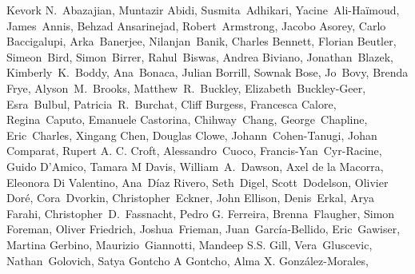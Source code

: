 \begin{raggedright}
\small
Kevork N.\ Abazajian,
Muntazir Abidi,
Susmita~Adhikari,
Yacine~Ali-Ha\"imoud,
James~Annis,
Behzad Ansarinejad,
Robert~Armstrong,
Jacobo Asorey,
Carlo Baccigalupi,
Arka~Banerjee,
Nilanjan~Banik,
Charles Bennett,
Florian Beutler,
Simeon~Bird,
Simon~Birrer,
Rahul~Biswas,
Andrea Biviano,
Jonathan~Blazek,
Kimberly~K.~Boddy,
Ana~Bonaca,
Julian Borrill,
Sownak Bose,
Jo~Bovy,
Brenda Frye,
Alyson~M.~Brooks,
Matthew~R.~Buckley,
Elizabeth~Buckley-Geer,
Esra~Bulbul,
Patricia~R.~Burchat,
Cliff Burgess,
Francesca Calore,
Regina~Caputo,
Emanuele Castorina,
Chihway~Chang,
George~Chapline,
Eric~Charles,
Xingang Chen,
Douglas Clowe,
Johann~Cohen-Tanugi,
Johan Comparat,
Rupert A. C. Croft,
Alessandro~Cuoco,
Francis-Yan~Cyr-Racine,
Guido D'Amico,
Tamara M Davis,
William~A.~Dawson,
Axel de la Macorra,
Eleonora Di Valentino,
Ana~D\'{i}az Rivero,
Seth~Digel,
Scott~Dodelson,
Olivier Dor\'e,
Cora~Dvorkin,
Christopher~Eckner,
John Ellison,
Denis~Erkal,
Arya Farahi,
Christopher~D.~Fassnacht,
Pedro G. Ferreira,
Brenna~Flaugher,
Simon Foreman,
Oliver Friedrich,
Joshua~Frieman,
Juan~Garc\'ia-Bellido,
Eric~Gawiser,
Martina Gerbino,
Maurizio~Giannotti,
Mandeep S.S. Gill,
Vera~Gluscevic,
Nathan~Golovich,
Satya {Gontcho A Gontcho},
Alma X. Gonz\'alez-Morales,

\end{raggedright}
